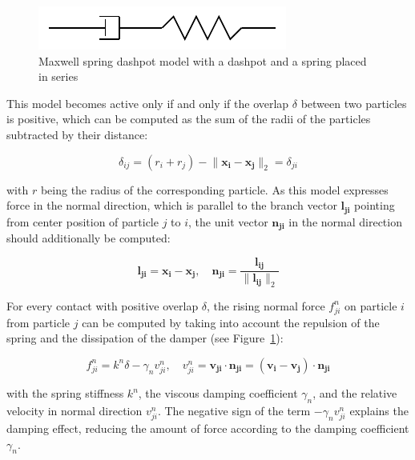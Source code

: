 \documentclass[11pt,
               a4paper,
               bibtotoc,
               idxtotoc,
               headsepline,
               footsepline,
               footexclude,
               BCOR12mm,
               DIV13,
               openany,   %
               ]
               {scrbook}
\begin{document}
 \begin{figure}[H] %
	\centering
	\includegraphics[width=.5\columnwidth]{figures/maxwell_spring_dashpot.pdf}
	\caption[Example Figure]{Maxwell spring dashpot model with a dashpot and a spring placed in series}
	\label{fig:maxwell_spring_dashpot} %
\end{figure}

This model becomes active only if and only if the overlap $\delta$ between two particles is positive, which can be computed as the sum of the radii of the particles subtracted by their distance:

\begin{equation}
	\delta_{ij} = (r_i + r_j) - \lVert \mathbf{x_i} -\mathbf{ x_j} \rVert_2 = \delta_{ji}
\end{equation}

with $r$ being the radius of the corresponding particle.
As this model expresses force in the normal direction, which is parallel to the branch vector $\mathbf{l_{ji}}$ pointing from center position of particle $j$ to $i$, the unit vector $\mathbf{n_{ji}}$ in the normal direction should additionally be computed:

\begin{equation}
	\mathbf{l_{ji}} =  \mathbf{x_i} - \mathbf{x_j}, \quad \mathbf{n_{ji}} =\frac{\mathbf{l_{ij}}}{\lVert \mathbf{l_{ij}} \rVert_2}
\end{equation}

For every contact with positive overlap $\delta$, the rising normal force $f_{ji}^n$ on particle $i$ from particle $j$ can be computed by taking into account the repulsion of the spring and the dissipation of the damper (see Figure~\ref{fig:maxwell_spring_dashpot}):

\begin{equation}
	f_{ji}^n = k^n\delta - \gamma_n v_{ji}^n, \quad v_{ji}^n = \mathbf{v_{ji}} \cdot \mathbf{n_{ji}} = (\mathbf{v_i} - \mathbf{v_j}) \cdot \mathbf{n_{ji}}
\end{equation}

with the spring stiffness $k^n$, the viscous damping coefficient $\gamma_n$, and the relative velocity in normal direction $v_{ji}^n$. The negative sign of the term $-\gamma_n v_{ji}^n$ explains the damping effect, reducing the amount of force according to the damping coefficient $\gamma_n$.
\end{document}
